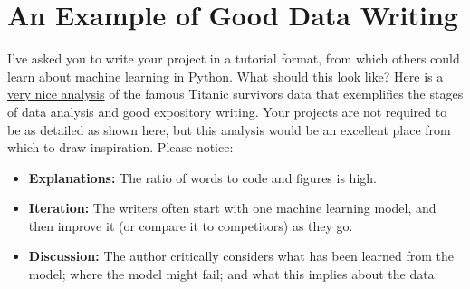 \documentclass[12pt]{article}
\begin{document}
\section{An Example of Good Data Writing}
I’ve asked you to write your project in a tutorial format, from which others could learn about machine learning in Python. What should this look like? Here is a \href{https://humansofdata.atlan.com/2016/07/machine-learning-python/}{very nice analysis} of the famous Titanic survivors data that exemplifies the stages of data analysis and good expository writing. Your projects are not required to be as detailed as shown here, but this analysis would be an excellent place from which to draw inspiration. Please notice:
\begin{itemize}
\item {\bf Explanations:} The ratio of words to code and figures is high.
\item {\bf Iteration:} The writers often start with one machine learning model, and then improve it (or compare it to competitors) as they go.
\item {\bf Discussion:} The author critically considers what has been learned from the model; where the model might fail; and what this implies about the data.
\end{itemize}
\end{document}
